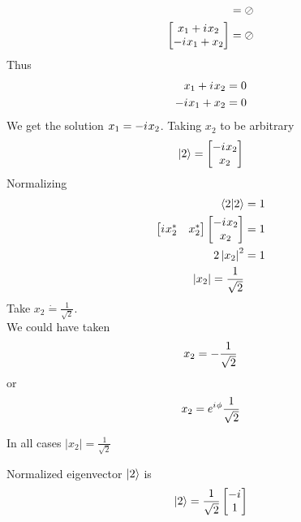 \begin{enumerate}
\begin{eqnarray}
		&= \oslash \nonumber \\
		\left[\begin{matrix}
		x_1 + {i\mkern1mu} x_2 \\ -{i\mkern1mu} x_1 + x_2
		\end{matrix}\right]
		&= \oslash \nonumber
	\end{eqnarray}
	Thus
	\begin{eqnarray}
		x_1 + {i\mkern1mu} x_2 &= 0 \label{chapter5.eqn2-example2} \\
		-{i\mkern1mu} x_1 + x_2 &= 0 \label{chapter5.eqn3-example2}
	\end{eqnarray}
	We get the solution $x_1 = -{i\mkern1mu} x_2$. Taking $x_2$ to be arbitrary
	\begin{equation}
		\ket{2} = \left[\begin{matrix}
			-{i\mkern1mu} x_2 \\ x_2
		\end{matrix}\right]
	\end{equation}
	Normalizing
	\begin{eqnarray}
		\braket{2}{2} &= 1 \nonumber \\
		\left[\begin{matrix}
		{i\mkern1mu} x_2^* & x_2^*
		\end{matrix}\right]
				\left[\begin{matrix}
		-{i\mkern1mu} x_2 \\ x_2
		\end{matrix}\right] 
		&=1 \nonumber \\
		2 \left|x_2\right|^2 &= 1 \nonumber \\
		\left|x_2\right| = \frac{1}{\sqrt{2}}
	\end{eqnarray}
	Take $x_2 \dot{=} \frac{1}{\sqrt{2}}$.\\
	We could have taken
	\begin{equation}
		x_2 = -\frac{1}{\sqrt{2}} \\
	\end{equation}
	or
	\begin{equation}
		x_2 = e^{{i\mkern1mu} \phi} \frac{1}{\sqrt{2}} \\
	\end{equation}

	In all cases $\left|x_2\right| = \frac{1}{\sqrt{2}}$
	
	Normalized eigenvector $\ket{2}$ is
	\begin{equation}
		\ket{2} = \frac{1}{\sqrt{2}} \left[\begin{matrix}
			-{i\mkern1mu} \\ 1
		\end{matrix}\right]
	\end{equation}
	

\end{enumerate}
